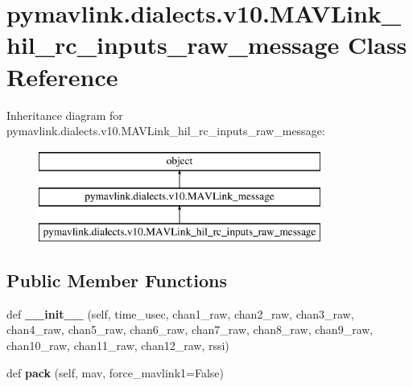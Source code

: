 \hypertarget{classpymavlink_1_1dialects_1_1v10_1_1MAVLink__hil__rc__inputs__raw__message}{}\section{pymavlink.\+dialects.\+v10.\+M\+A\+V\+Link\+\_\+hil\+\_\+rc\+\_\+inputs\+\_\+raw\+\_\+message Class Reference}
\label{classpymavlink_1_1dialects_1_1v10_1_1MAVLink__hil__rc__inputs__raw__message}
Inheritance diagram for pymavlink.\+dialects.\+v10.\+M\+A\+V\+Link\+\_\+hil\+\_\+rc\+\_\+inputs\+\_\+raw\+\_\+message\+:\begin{figure}[H]
\begin{center}
\leavevmode
\includegraphics[height=3.000000cm]{classpymavlink_1_1dialects_1_1v10_1_1MAVLink__hil__rc__inputs__raw__message}
\end{center}
\end{figure}
\subsection*{Public Member Functions}
\begin{DoxyCompactItemize}
\item 
\mbox{\label{classpymavlink_1_1dialects_1_1v10_1_1MAVLink__hil__rc__inputs__raw__message_ac226903b3c4fdf7f317a0e2a8be411bd}} 
def {\bfseries \+\_\+\+\_\+init\+\_\+\+\_\+} (self, time\+\_\+usec, chan1\+\_\+raw, chan2\+\_\+raw, chan3\+\_\+raw, chan4\+\_\+raw, chan5\+\_\+raw, chan6\+\_\+raw, chan7\+\_\+raw, chan8\+\_\+raw, chan9\+\_\+raw, chan10\+\_\+raw, chan11\+\_\+raw, chan12\+\_\+raw, rssi)
\item 
\mbox{\label{classpymavlink_1_1dialects_1_1v10_1_1MAVLink__hil__rc__inputs__raw__message_a2a095ef0a69ed7b6d82e425c5621f6c6}} 
def {\bfseries pack} (self, mav, force\+\_\+mavlink1=False)
\end{DoxyCompactItemize}
